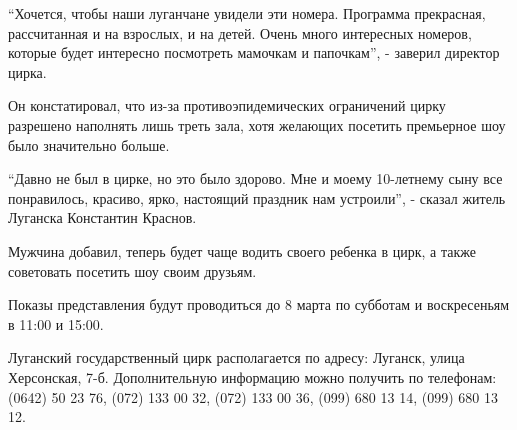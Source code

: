 \enquote{Хочется, чтобы наши луганчане увидели эти номера. Программа
прекрасная, рассчитанная и на взрослых, и на детей. Очень много интересных
номеров, которые будет интересно посмотреть мамочкам и папочкам}, - заверил
директор цирка.


Он констатировал, что из-за противоэпидемических ограничений цирку разрешено
наполнять лишь треть зала, хотя желающих посетить премьерное шоу было
значительно больше.


\enquote{Давно не был в цирке, но это было здорово. Мне и моему 10-летнему сыну
все понравилось, красиво, ярко, настоящий праздник нам устроили}, - сказал
житель Луганска Константин Краснов.


Мужчина добавил, теперь будет чаще водить своего ребенка в цирк, а также
советовать посетить шоу своим друзьям.


Показы представления будут проводиться до 8 марта по субботам и воскресеньям в
11:00 и 15:00.


Луганский государственный цирк располагается по адресу: Луганск, улица
Херсонская, 7-б. Дополнительную информацию можно получить по телефонам: (0642)
50 23 76, (072) 133 00 32, (072) 133 00 36, (099) 680 13 14, (099) 680 13 12. 

